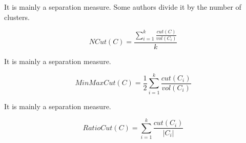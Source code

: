 It is mainly a separation measure. Some authors divide it by the number of clusters.

\begin{equation}
NCut(C)= \frac{\sum_{i=1}^{k}\frac{cut(C)}{vol(C_{i})}}{k}
\end{equation}


It is mainly a separation measure.

\begin{equation}
MinMaxCut(C)=\frac{1}{2}\sum_{i=1}^{k}\frac{cut(C_{i})}{vol(C_{i})}
\end{equation}

It is mainly a separation measure.

\begin{equation}
RatioCut(C)=\sum_{i=1}^{k}\frac{cut(C_{i})}{|C_{i}|}
\end{equation}


